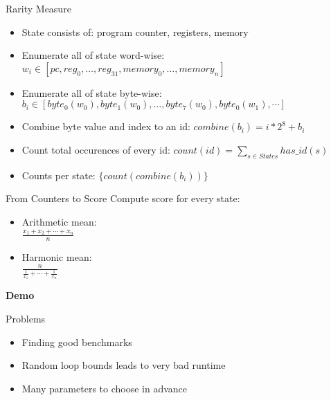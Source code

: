 \documentclass[10pt]{beamer}
\begin{document}
\begin{frame}{Rarity Measure}
	\begin{itemize}
    \item State consists of: program counter, registers, memory
    \item Enumerate all of state word-wise: $w_i \in [pc, reg_0, \ldots, reg_{31}, memory_0, \ldots, memory_n]$
    \item Enumerate all of state byte-wise: $b_i \in [ byte_0(w_0), byte_1(w_0), \ldots, byte_7(w_0), byte_0(w_1), \cdots ]$
    \item Combine byte value and index to an id: $combine(b_i) = i * 2^8 + b_i$
    \item Count total occurences of every id: $count(id) = \sum_{s \in States} has\_id(s)$
    \item Counts per state: $\{ count(combine(b_i)) \}$
	\end{itemize}
\end{frame}

\begin{frame}{From Counters to Score}
  Compute score for every state:

  \begin{itemize}
    \item Arithmetic mean: \\
      $\frac{x_1 + x_2 + \cdots + x_n}{n}$
    \item Harmonic mean: \\
      $\frac{n}{\frac{1}{x_1} + \dotsb + \frac{1}{x_n}}$
  \end{itemize}
\end{frame}

\begin{frame}[standout]
  \textbf{Demo}
\end{frame}

\begin{frame}{Problems}
  \begin{itemize}
      \item Finding good benchmarks
      \item Random loop bounds leads to very bad runtime
      \item Many parameters to choose in advance
  \end{itemize}
\end{frame}

\nocite{*}
\begin{frame}[allowframebreaks]
    \printbibliography
\end{frame}
\end{document}

